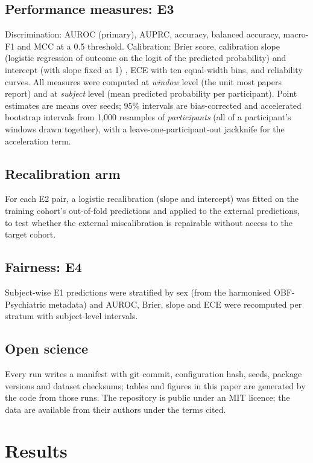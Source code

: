 \documentclass[11pt,a4paper]{article}
\begin{document}
\subsection{Performance measures: E3}
Discrimination: AUROC (primary), AUPRC, accuracy, balanced accuracy, macro-F1 and MCC at a 0.5
threshold. Calibration: Brier score, calibration slope (logistic regression of outcome on the
logit of the predicted probability) and intercept (with slope fixed at 1)
\cite{vancalster2019}, ECE with ten equal-width bins, and reliability curves. All measures were
computed at \emph{window} level (the unit most papers report) and at \emph{subject} level (mean
predicted probability per participant). Point estimates are means over seeds; 95\% intervals are
bias-corrected and accelerated bootstrap intervals from 1{,}000 resamples of \emph{participants}
(all of a participant's windows drawn together), with a leave-one-participant-out jackknife for
the acceleration term.

\subsection{Recalibration arm}
For each E2 pair, a logistic recalibration (slope and intercept) was fitted on the training
cohort's out-of-fold predictions and applied to the external predictions, to test whether the
external miscalibration is repairable without access to the target cohort.

\subsection{Fairness: E4}
Subject-wise E1 predictions were stratified by sex (from the harmonised OBF-Psychiatric
metadata) and AUROC, Brier, slope and ECE were recomputed per stratum with subject-level intervals.

\subsection{Open science}
Every run writes a manifest with git commit, configuration hash, seeds, package versions and
dataset checksums; tables and figures in this paper are generated by the code from those runs. The
repository is public under an MIT licence; the data are available from their authors under the
terms cited.

\section{Results}
\end{document}

